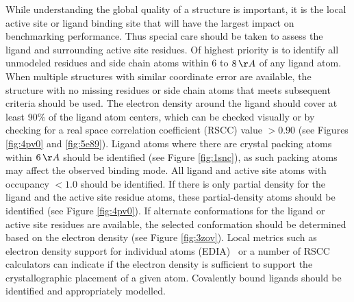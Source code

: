 \documentclass[9pt,bestpractices]{livecoms}
\begin{document}
While understanding the global quality of a structure is important, it is the local active site or ligand binding site that will have the largest impact on benchmarking performance. Thus special care should be taken to assess the ligand and surrounding active site residues. 
%
Of highest priority is to identify all unmodeled residues and side chain atoms within 6 to $8\,\AA$  of any ligand atom. When multiple structures with similar coordinate error are available, the structure with no missing residues or side chain atoms that meets subsequent criteria should be used.
%
The electron density around the ligand should cover at least 90\% of the ligand atom centers, which can be checked visually or by checking for a real space correlation coefficient (RSCC) value $>0.90$ (see Figures \ref{fig:4pv0} and \ref{fig:5e89}). Ligand atoms where there are crystal packing atoms within $6\,\AA$ should be identified (see Figure \ref{fig:1snc}), as such packing atoms may affect the observed binding mode. 
%
All ligand and active site atoms with occupancy $<1.0$ should be identified.
%
If there is only partial density for the ligand and the active site residue atoms, these partial-density atoms should be identified (see Figure \ref{fig:4pv0}). If alternate conformations for the ligand or active site residues are available, the selected conformation should be determined based on the electron density (see Figure \ref{fig:3zov}). Local metrics such as electron density support for individual atoms (EDIA)~\cite{meyder_estimating_2017} or a number of RSCC~\cite{tickle_statistical_2012} calculators can indicate if the electron density is sufficient to support the crystallographic placement of a given atom.
%
Covalently bound ligands should be identified and appropriately modelled.
\end{document}
